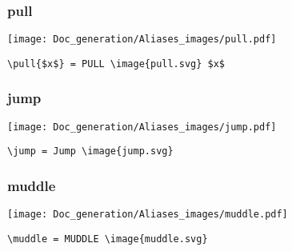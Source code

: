 \documentclass{article}
\begin{document}
\subsubsection{pull}
\begin{minipage}{0.45\linewidth}
\raggedright
\begin{spverbatim}
\end{spverbatim}
\end{minipage}
\begin{minipage}{0.45\linewidth}
\raggedleft
\texttt{[image: Doc\_generation/Aliases\_images/pull.pdf]}
\end{minipage}
\begin{center}
\begin{BVerbatim}
\pull{$x$} = PULL \image{pull.svg} $x$
\end{BVerbatim}
\end{center}

\subsubsection{jump}
\begin{minipage}{0.45\linewidth}
\raggedright
\begin{spverbatim}
\jump
\end{spverbatim}
\end{minipage}
\begin{minipage}{0.45\linewidth}
\raggedleft
\texttt{[image: Doc\_generation/Aliases\_images/jump.pdf]}
\end{minipage}
\begin{center}
\begin{BVerbatim}
\jump = Jump \image{jump.svg}
\end{BVerbatim}
\end{center}

\subsubsection{muddle}
\begin{minipage}{0.45\linewidth}
\raggedright
\begin{spverbatim}
\muddle
\end{spverbatim}
\end{minipage}
\begin{minipage}{0.45\linewidth}
\raggedleft
\texttt{[image: Doc\_generation/Aliases\_images/muddle.pdf]}
\end{minipage}
\begin{center}
\begin{BVerbatim}
\muddle = MUDDLE \image{muddle.svg}
\end{BVerbatim}
\end{center}
\end{document}
